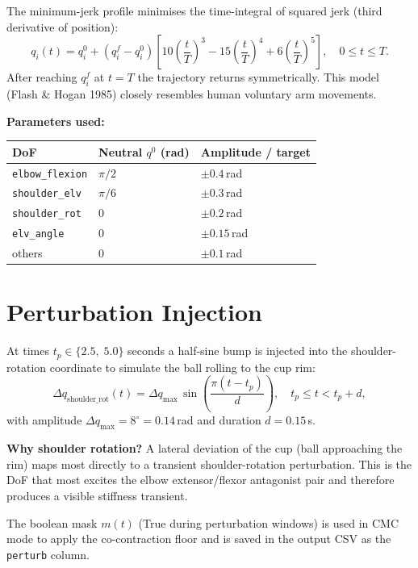 \documentclass[11pt,a4paper]{article}
\begin{document}
The minimum-jerk profile minimises the time-integral of squared jerk
(third derivative of position):
\[
  q_i(t) = q_i^0 + (q_i^f - q_i^0)
             \left[10\left(\frac{t}{T}\right)^3
                  -15\left(\frac{t}{T}\right)^4
                  + 6\left(\frac{t}{T}\right)^5\right], \quad 0\le t\le T.
\]
After reaching $q_i^f$ at $t=T$ the trajectory returns symmetrically.
This model (Flash \& Hogan 1985) closely resembles human voluntary arm
movements.

\textbf{Parameters used:}
\begin{center}
\begin{tabular}{lll}
\toprule
DoF & Neutral $q^0$ (rad) & Amplitude / target\\
\midrule
\texttt{elbow\_flexion}  & $\pi/2$ & $\pm 0.4\,$rad \\
\texttt{shoulder\_elv}   & $\pi/6$ & $\pm 0.3\,$rad \\
\texttt{shoulder\_rot}   & 0       & $\pm 0.2\,$rad \\
\texttt{elv\_angle}      & 0       & $\pm 0.15\,$rad\\
others                   & 0       & $\pm 0.1\,$rad \\
\bottomrule
\end{tabular}
\end{center}

\section{Perturbation Injection}

At times $t_p \in \{2.5,\;5.0\}$ seconds a half-sine bump is injected into
the shoulder-rotation coordinate to simulate the ball rolling to the cup rim:
\[
  \Delta q_\text{shoulder\_rot}(t) =
    \Delta q_\text{max}\,\sin\!\left(\frac{\pi(t-t_p)}{d}\right),
  \quad t_p \le t < t_p + d,
\]
with amplitude $\Delta q_\text{max} = 8^\circ = 0.14\,$rad and duration
$d = 0.15\,$s.

\textbf{Why shoulder rotation?} A lateral deviation of the cup (ball
approaching the rim) maps most directly to a transient shoulder-rotation
perturbation. This is the DoF that most excites the elbow
extensor/flexor antagonist pair and therefore produces a visible stiffness
transient.

The boolean mask $m(t)$ (True during perturbation windows) is used in CMC
mode to apply the co-contraction floor and is saved in the output CSV as
the \texttt{perturb} column.
\end{document}
